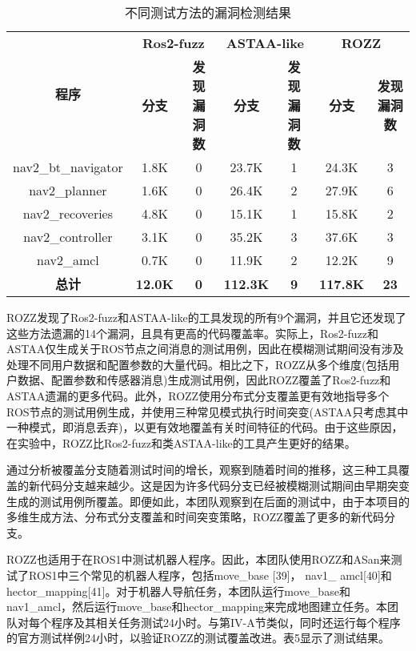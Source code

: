 \begin{table}[H]
\small
\caption{不同测试方法的漏洞检测结果}
\centering
\begin{tabular}{ccccccc}
\hline
\multirow{2}{*}{\textbf{程序}} & \multicolumn{2}{c}{\textbf{Ros2-fuzz}} & \multicolumn{2}{c}{\textbf{ASTAA-like}} & \multicolumn{2}{c}{\textbf{ROZZ}} \\
\cline{2-7}
& \textbf{分支} & \textbf{发现漏洞数} & \textbf{分支} & \textbf{发现漏洞数} & \textbf{分支} & \textbf{发现漏洞数} \\
\hline
nav2\_bt\_navigator & 1.8K & 0 & 23.7K & 1 & 24.3K & 3 \\
nav2\_planner & 1.6K & 0 & 26.4K & 2 & 27.9K & 6 \\
nav2\_recoveries & 4.8K & 0 & 15.1K & 1 & 15.8K & 2 \\
nav2\_controller & 3.1K & 0 & 35.2K & 3 & 37.6K & 3 \\
nav2\_amcl & 0.7K & 0 & 11.9K & 2 & 12.2K & 9 \\
\textbf{总计} & \textbf{12.0K} & \textbf{0} & \textbf{112.3K} & \textbf{9} & \textbf{117.8K} & \textbf{23} \\
\hline
\end{tabular}
\end{table}

ROZZ发现了Ros2-fuzz和ASTAA-like的工具发现的所有9个漏洞，并且它还发现了这些方法遗漏的14个漏洞，且具有更高的代码覆盖率。实际上，Ros2-fuzz和ASTAA仅生成关于ROS节点之间消息的测试用例，因此在模糊测试期间没有涉及处理不同用户数据和配置参数的大量代码。相比之下，ROZZ从多个维度(包括用户数据、配置参数和传感器消息)生成测试用例，因此ROZZ覆盖了Ros2-fuzz和ASTAA遗漏的更多代码。此外，ROZZ使用分布式分支覆盖更有效地指导多个ROS节点的测试用例生成，并使用三种常见模式执行时间突变(ASTAA只考虑其中一种模式，即消息丢弃)，以更有效地覆盖有关时间特征的代码。由于这些原因，在实验中，ROZZ比Ros2-fuzz和类ASTAA-like的工具产生更好的结果。

通过分析被覆盖分支随着测试时间的增长，观察到随着时间的推移，这三种工具覆盖的新代码分支越来越少。这是因为许多代码分支已经被模糊测试期间由早期突变生成的测试用例所覆盖。即便如此，本团队观察到在后面的测试中，由于本项目的多维生成方法、分布式分支覆盖和时间突变策略，ROZZ覆盖了更多的新代码分支。

ROZZ也适用于在ROS1中测试机器人程序。因此，本团队使用ROZZ和ASan来测试了ROS1中三个常见的机器人程序，包括move\_base
{[}39{]}， nav1\_
amcl{[}40{]}和hector\_mapping{[}41{]}。对于机器人导航任务，本团队运行move\_base和nav1\_amcl，然后运行move\_base和hector\_mapping来完成地图建立任务。本团队对每个程序及其相关任务测试24小时。与第IV-A节类似，同时还运行每个程序的官方测试样例24小时，以验证ROZZ的测试覆盖改进。表5显示了测试结果。

